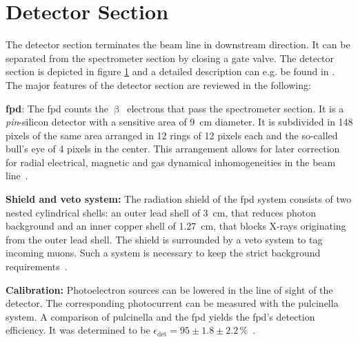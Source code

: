 \section{Detector Section}
\label{sec:katrinExpSetupDetector}
\begin{figure}[t]
 \label{fig:katrinExpSetupDetector}
\end{figure}

The detector section terminates the beam line in downstream direction. It can be separated from the spectrometer section by closing a gate valve. The detector section is depicted in figure \ref{fig:katrinExpSetupDetector} and a detailed description can e.g. be found in \cite{Amsbaugh2015}. The major features of the detector section are reviewed in the following:

{\par \textbf{\Gls{fpd}}: The \gls{fpd} counts the $\upbeta$~electrons that pass the spectrometer section. It is a \textit{pin}-silicon detector with a sensitive area of \SI{9}{cm} diameter. It is subdivided in 148 pixels of the same area arranged in 12 rings of 12 pixels each and the so-called bull's eye of 4 pixels in the center. This arrangement allows for later correction for radial electrical, magnetic and gas dynamical inhomogeneities in the beam line~\cite{Amsbaugh2015}.}

{\par \textbf{Shield and veto system:} The radiation shield of the \gls{fpd} system consists of two nested cylindrical shells: an outer lead shell of \SI{3}{cm}, that reduces photon background and an inner copper shell of \SI{1.27}{cm}, that blocks X-rays originating from the outer lead shell. The shield is surrounded by a veto system to tag incoming muons. Such a system is necessary to keep the strict background requirements~\cite{Amsbaugh2015}.}

{\par \textbf{Calibration:} Photoelectron sources can be lowered in the line of sight of the detector. The corresponding photocurrent can be measured with the \gls{pulcinella} system. A comparison of \gls{pulcinella} and the \gls{fpd} yields the \gls{fpd}'s detection efficiency. It was determined to be $\epsilon_\mathrm{det}=95\pm1.8\pm2.2\,\text{\%}$~\cite{Amsbaugh2015}.}


